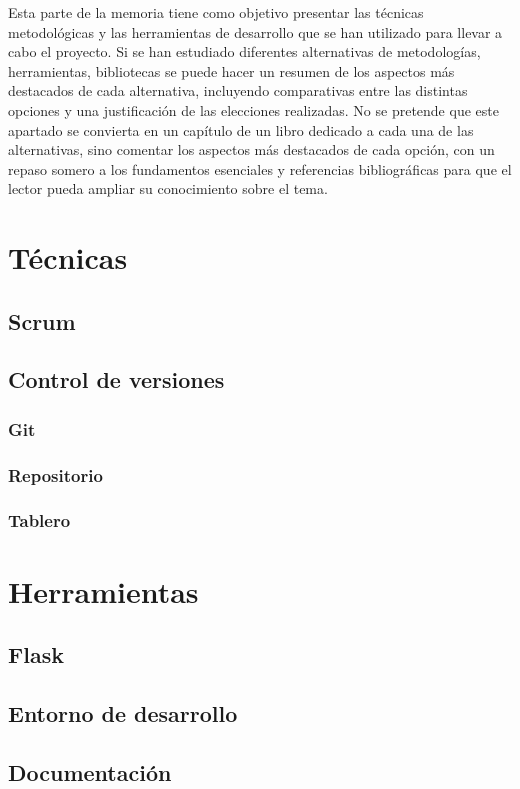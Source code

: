 
Esta parte de la memoria tiene como objetivo presentar las técnicas metodológicas y las herramientas de desarrollo que se han utilizado para llevar a cabo el proyecto. Si se han estudiado diferentes alternativas de metodologías, herramientas, bibliotecas se puede hacer un resumen de los aspectos más destacados de cada alternativa, incluyendo comparativas entre las distintas opciones y una justificación de las elecciones realizadas. 
No se pretende que este apartado se convierta en un capítulo de un libro dedicado a cada una de las alternativas, sino comentar los aspectos más destacados de cada opción, con un repaso somero a los fundamentos esenciales y referencias bibliográficas para que el lector pueda ampliar su conocimiento sobre el tema.

\section{Técnicas}

\subsection{Scrum}


\subsection{Control de versiones}

\subsubsection{Git}


\subsubsection{Repositorio}


\subsubsection{Tablero}



\section{Herramientas}

\subsection{Flask}

\subsection{Entorno de desarrollo}

\subsection{Documentación}



